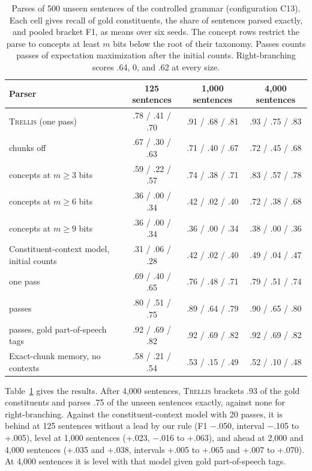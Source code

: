 \documentclass[11pt,letterpaper]{article}
\newcommand{\trellis}{\textsc{Trellis}}
\begin{document}
\begin{table}[!htbp]
\caption{Parses of 500 unseen sentences of the controlled grammar (configuration C13). Each cell gives recall of gold constituents, the share of sentences parsed exactly, and pooled bracket F1, as means over six seeds. The concept rows restrict the parse to concepts at least $m$ bits below the root of their taxonomy. Passes counts passes of expectation maximization after the initial counts. Right-branching scores .64, 0, and .62 at every size.}
\label{tab:controlled-parse}
\begin{center}
\footnotesize
\begin{tabular}{lccc}
\toprule
Parser & 125 sentences & 1,000 sentences & 4,000 sentences \\
\midrule
\trellis{} (one pass) & .78 / .41 / .70 & .91 / .68 / .81 & .93 / .75 / .83 \\
\quad chunks off & .67 / .30 / .63 & .71 / .40 / .67 & .72 / .45 / .68 \\
\quad concepts at $m \geq 3$ bits & .59 / .22 / .57 & .74 / .38 / .71 & .83 / .57 / .78 \\
\quad concepts at $m \geq 6$ bits & .36 / .00 / .34 & .42 / .02 / .40 & .72 / .38 / .68 \\
\quad concepts at $m \geq 9$ bits & .36 / .00 / .34 & .36 / .00 / .34 & .38 / .00 / .36 \\
Constituent-context model, initial counts & .31 / .06 / .28 & .42 / .02 / .40 & .49 / .04 / .47 \\
\quad one pass & .69 / .40 / .65 & .76 / .48 / .71 & .79 / .51 / .74 \\
\quad 20 passes & .80 / .51 / .75 & .89 / .64 / .79 & .90 / .65 / .80 \\
\quad 20 passes, gold part-of-speech tags & .92 / .69 / .82 & .92 / .69 / .82 & .92 / .69 / .82 \\
Exact-chunk memory, no contexts & .58 / .21 / .54 & .53 / .15 / .49 & .52 / .10 / .48 \\
\bottomrule
\end{tabular}
\end{center}
\end{table}

Table~\ref{tab:controlled-parse} gives the results. After 4,000 sentences, \trellis{} brackets .93 of the gold constituents and parses .75 of the unseen sentences exactly, against none for right-branching.
Against the constituent-context model with 20 passes, it is behind at 125 sentences without a lead by our rule (F1 $-$.050, interval $-$.105 to +.005), level at 1,000 sentences (+.023, $-$.016 to +.063), and ahead at 2,000 and 4,000 sentences (+.035 and +.038, intervals +.005 to +.065 and +.007 to +.070).
At 4,000 sentences it is level with that model given gold part-of-speech tags.
\end{document}
